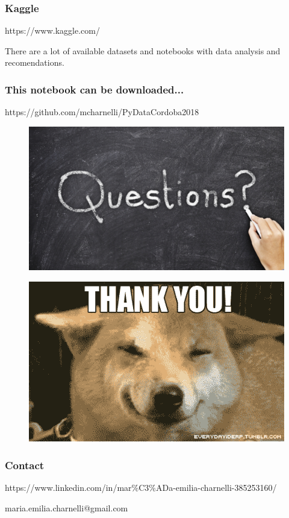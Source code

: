 \documentclass[11pt]{article}
\makeatletter
\def\maxwidth{\ifdim\Gin@nat@width>\linewidth\linewidth
    \else\Gin@nat@width\fi}
\let\Oldincludegraphics\includegraphics
\renewcommand{\includegraphics}[1]{\Oldincludegraphics[width=.8\maxwidth]{#1}}
\makeatother
\begin{document}
    \subsubsection{Kaggle}\label{kaggle}

https://www.kaggle.com/

There are a lot of available datasets and notebooks with data analysis
and recomendations.

    \subsubsection{This notebook can be
downloaded...}\label{this-notebook-can-be-downloaded...}

https://github.com/mcharnelli/PyDataCordoba2018

    \begin{figure}[htbp]
\centering
\includegraphics{questions.jpg}
\caption{}
\end{figure}

    \begin{figure}[htbp]
\centering
\includegraphics{Thankyou.gif}
\caption{}
\end{figure}

    \subsubsection{Contact}\label{contact}

https://www.linkedin.com/in/mar\%C3\%ADa-emilia-charnelli-385253160/

maria.emilia.charnelli@gmail.com


    
    
    
    
\end{document}
